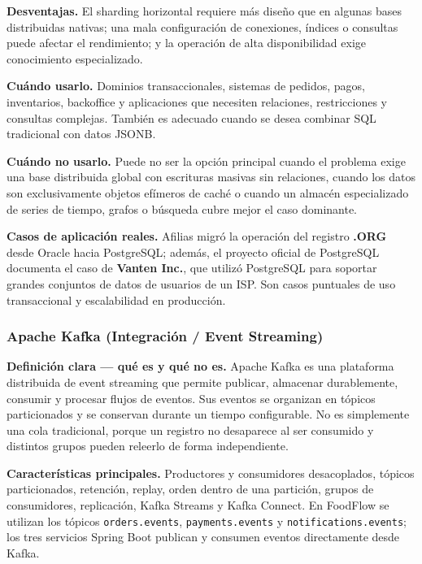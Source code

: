 \documentclass[12pt,a4paper]{article}
\begin{document}
\textbf{Desventajas.} El sharding horizontal requiere más diseño que en algunas bases distribuidas nativas; una mala configuración de conexiones, índices o consultas puede afectar el rendimiento; y la operación de alta disponibilidad exige conocimiento especializado.

\textbf{Cuándo usarlo.} Dominios transaccionales, sistemas de pedidos, pagos, inventarios, backoffice y aplicaciones que necesiten relaciones, restricciones y consultas complejas. También es adecuado cuando se desea combinar SQL tradicional con datos JSONB.

\textbf{Cuándo no usarlo.} Puede no ser la opción principal cuando el problema exige una base distribuida global con escrituras masivas sin relaciones, cuando los datos son exclusivamente objetos efímeros de caché o cuando un almacén especializado de series de tiempo, grafos o búsqueda cubre mejor el caso dominante.

\textbf{Casos de aplicación reales.} Afilias migró la operación del registro \textbf{.ORG} desde Oracle hacia PostgreSQL; además, el proyecto oficial de PostgreSQL documenta el caso de \textbf{Vanten Inc.}, que utilizó PostgreSQL para soportar grandes conjuntos de datos de usuarios de un ISP. Son casos puntuales de uso transaccional y escalabilidad en producción. \cite{postgres-afilias,postgres-vanten}

\subsubsection{Apache Kafka (Integración / Event Streaming)}

\textbf{Definición clara --- qué es y qué no es.} Apache Kafka es una plataforma distribuida de event streaming que permite publicar, almacenar durablemente, consumir y procesar flujos de eventos. Sus eventos se organizan en tópicos particionados y se conservan durante un tiempo configurable. No es simplemente una cola tradicional, porque un registro no desaparece al ser consumido y distintos grupos pueden releerlo de forma independiente. \cite{kafka-intro}

\textbf{Características principales.} Productores y consumidores desacoplados, tópicos particionados, retención, replay, orden dentro de una partición, grupos de consumidores, replicación, Kafka Streams y Kafka Connect. En FoodFlow se utilizan los tópicos \texttt{orders.events}, \texttt{payments.events} y \texttt{notifications.events}; los tres servicios Spring Boot publican y consumen eventos directamente desde Kafka. \cite{kafka-intro}
\end{document}
